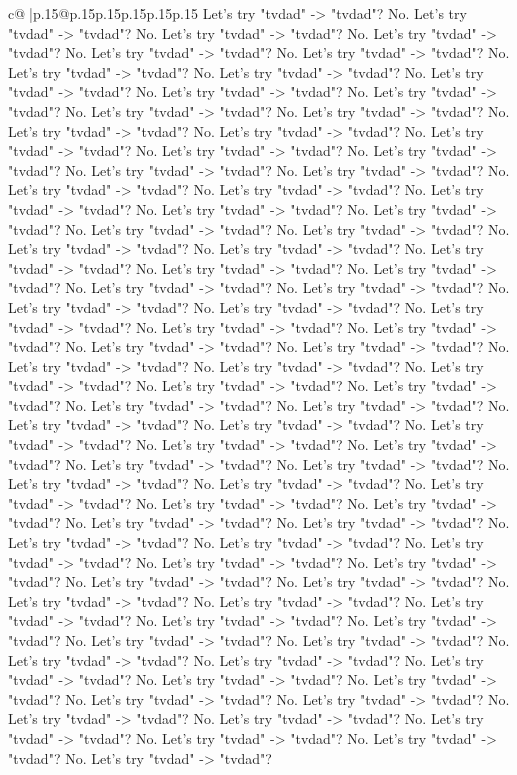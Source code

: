\documentclass{article}
\begin{document}
{\begin{supertabular}{c@{$\;$}|p{.15\linewidth}@{}p{.15\linewidth}p{.15\linewidth}p{.15\linewidth}p{.15\linewidth}p{.15\linewidth}}
{{{Let's try "tvdad" {-}> "tvdad"? No. Let's try "tvdad" {-}> "tvdad"? No. Let's try "tvdad" {-}> "tvdad"? No. Let's try "tvdad" {-}> "tvdad"? No. Let's try "tvdad" {-}> "tvdad"? No. Let's try "tvdad" {-}> "tvdad"? No. Let's try "tvdad" {-}> "tvdad"? No. Let's try "tvdad" {-}> "tvdad"? No. Let's try "tvdad" {-}> "tvdad"? No. Let's try "tvdad" {-}> "tvdad"? No. Let's try "tvdad" {-}> "tvdad"? No. Let's try "tvdad" {-}> "tvdad"? No. Let's try "tvdad" {-}> "tvdad"? No. Let's try "tvdad" {-}> "tvdad"? No. Let's try "tvdad" {-}> "tvdad"? No. Let's try "tvdad" {-}> "tvdad"? No. Let's try "tvdad" {-}> "tvdad"? No. Let's try "tvdad" {-}> "tvdad"? No. Let's try "tvdad" {-}> "tvdad"? No. Let's try "tvdad" {-}> "tvdad"? No. Let's try "tvdad" {-}> "tvdad"? No. Let's try "tvdad" {-}> "tvdad"? No. Let's try "tvdad" {-}> "tvdad"? No. Let's try "tvdad" {-}> "tvdad"? No. Let's try "tvdad" {-}> "tvdad"? No. Let's try "tvdad" {-}> "tvdad"? No. Let's try "tvdad" {-}> "tvdad"? No. Let's try "tvdad" {-}> "tvdad"? No. Let's try "tvdad" {-}> "tvdad"? No. Let's try "tvdad" {-}> "tvdad"? No. Let's try "tvdad" {-}> "tvdad"? No. Let's try "tvdad" {-}> "tvdad"? No. Let's try "tvdad" {-}> "tvdad"? No. Let's try "tvdad" {-}> "tvdad"? No. Let's try "tvdad" {-}> "tvdad"? No. Let's try "tvdad" {-}> "tvdad"? No. Let's try "tvdad" {-}> "tvdad"? No. Let's try "tvdad" {-}> "tvdad"? No. Let's try "tvdad" {-}> "tvdad"? No. Let's try "tvdad" {-}> "tvdad"? No. Let's try "tvdad" {-}> "tvdad"? No. Let's try "tvdad" {-}> "tvdad"? No. Let's try "tvdad" {-}> "tvdad"? No. Let's try "tvdad" {-}> "tvdad"? No. Let's try "tvdad" {-}> "tvdad"? No. Let's try "tvdad" {-}> "tvdad"? No. Let's try "tvdad" {-}> "tvdad"? No. Let's try "tvdad" {-}> "tvdad"? No. Let's try "tvdad" {-}> "tvdad"? No. Let's try "tvdad" {-}> "tvdad"? No. Let's try "tvdad" {-}> "tvdad"? No. Let's try "tvdad" {-}> "tvdad"? No. Let's try "tvdad" {-}> "tvdad"? No. Let's try "tvdad" {-}> "tvdad"? No. Let's try "tvdad" {-}> "tvdad"? No. Let's try "tvdad" {-}> "tvdad"? No. Let's try "tvdad" {-}> "tvdad"? No. Let's try "tvdad" {-}> "tvdad"? No. Let's try "tvdad" {-}> "tvdad"? No. Let's try "tvdad" {-}> "tvdad"? No. Let's try "tvdad" {-}> "tvdad"? No. Let's try "tvdad" {-}> "tvdad"? No. Let's try "tvdad" {-}> "tvdad"? No. Let's try "tvdad" {-}> "tvdad"? No. Let's try "tvdad" {-}> "tvdad"? No. Let's try "tvdad" {-}> "tvdad"? No. Let's try "tvdad" {-}> "tvdad"? No. Let's try "tvdad" {-}> "tvdad"? No. Let's try "tvdad" {-}> "tvdad"? No. Let's try "tvdad" {-}> "tvdad"? No. Let's try "tvdad" {-}> "tvdad"? No. Let's try "tvdad" {-}> "tvdad"? No. Let's try "tvdad" {-}> "tvdad"? No. Let's try "tvdad" {-}> "tvdad"? No. Let's try "tvdad" {-}> "tvdad"? No. Let's try "tvdad" {-}> "tvdad"? No. Let's try "tvdad" {-}> "tvdad"? No. Let's try "tvdad" {-}> "tvdad"? No. Let's try "tvdad" {-}> "tvdad"? No. Let's try "tvdad" {-}> "tvdad"? No. Let's try "tvdad" {-}> "tvdad"? No. Let's try "tvdad" {-}> "tvdad"? No. Let's try "tvdad" {-}> "tvdad"? No. Let's try "tvdad" {-}> "tvdad"? No. Let's try "tvdad" {-}> "tvdad"? No. Let's try "tvdad" {-}> "tvdad"? No. Let's try "tvdad" {-}> "tvdad"? No. Let's try "tvdad" {-}> "tvdad"? No. Let's try "tvdad" {-}> "tvdad"? }}}
\end{supertabular}}
\end{document}

